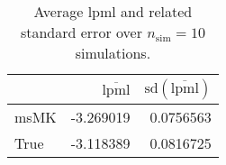 \begin{table}[H]

\caption{Average lpml and related standard error over $n_{\text{sim}} = 10$ simulations.}
\centering
\begin{tabular}[t]{lrr}
\toprule
  & $\overbar{\text{lpml}}$ & $\text{sd}(\overbar{\text{lpml}})$\\
\midrule
msMK & -3.269019 & 0.0756563\\
True & -3.118389 & 0.0816725\\
\bottomrule
\end{tabular}
\end{table}